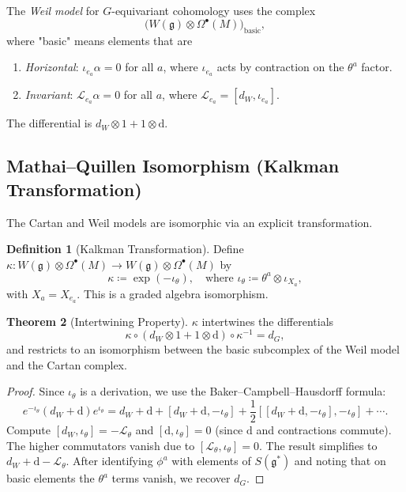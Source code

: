 \documentclass[10pt]{article}
\theoremstyle{definition}
\newtheorem{definition}{Definition}[section]
\newtheorem{theorem}[definition]{Theorem}
\newcommand{\diff}{\mathrm{d}}
\newcommand{\lie}[1]{\mathcal{L}_{#1}}
\newcommand{\cont}[1]{\iota_{#1}}
\begin{document}
The \emph{Weil model} for $G$-equivariant cohomology uses the complex
\begin{equation}\label{eq:weil-model}
    \bigl(W(\mathfrak{g}) \otimes \Omega^{\bullet}(M)\bigr)_{\text{basic}},
\end{equation}
where "basic" means elements that are
\begin{enumerate}
    \item \emph{Horizontal}: $\cont{e_a}\alpha = 0$ for all $a$, where $\cont{e_a}$ acts by contraction on the $\theta^a$ factor.
    \item \emph{Invariant}: $\lie{e_a}\alpha = 0$ for all $a$, where $\lie{e_a} = [d_W, \cont{e_a}]$.
\end{enumerate}
The differential is $d_W \otimes 1 + 1 \otimes \diff$.

\subsection{Mathai--Quillen Isomorphism (Kalkman Transformation)}\label{subsec:kalkman}
The Cartan and Weil models are isomorphic via an explicit transformation.

\begin{definition}[Kalkman Transformation]
Define $\kappa: W(\mathfrak{g}) \otimes \Omega^{\bullet}(M) \to W(\mathfrak{g}) \otimes \Omega^{\bullet}(M)$ by
\begin{equation}\label{eq:kalkman}
    \kappa \coloneqq \exp(-\cont{\theta}), \quad \text{where } \cont{\theta} \coloneqq \theta^{a} \otimes \cont{X_{a}},
\end{equation}
with $X_a = X_{e_a}$. This is a graded algebra isomorphism.
\end{definition}

\begin{theorem}[Intertwining Property]
$\kappa$ intertwines the differentials
\begin{equation}\label{eq:kalkman-intertwines}
    \kappa \circ (d_W \otimes 1 + 1 \otimes \diff) \circ \kappa^{-1} = d_{G},
\end{equation}
and restricts to an isomorphism between the basic subcomplex of the Weil model and the Cartan complex.
\end{theorem}
\begin{proof}
Since $\cont{\theta}$ is a derivation, we use the Baker--Campbell--Hausdorff formula:
\begin{equation}
e^{-\cont{\theta}} (d_W + \diff) e^{\cont{\theta}} = d_W + \diff + [d_W + \diff, -\cont{\theta}] + \frac{1}{2}[[d_W + \diff, -\cont{\theta}], -\cont{\theta}] + \cdots.
\end{equation}
Compute $[d_W, \cont{\theta}] = - \lie{\theta}$ and $[\diff, \cont{\theta}] = 0$ (since $\diff$ and contractions commute). The higher commutators vanish due to $[\lie{\theta}, \cont{\theta}] = 0$. The result simplifies to $d_W + \diff - \lie{\theta}$. After identifying $\phi^a$ with elements of $S(\mathfrak{g}^*)$ and noting that on basic elements the $\theta^a$ terms vanish, we recover $d_G$.
\end{proof}
\end{document}

